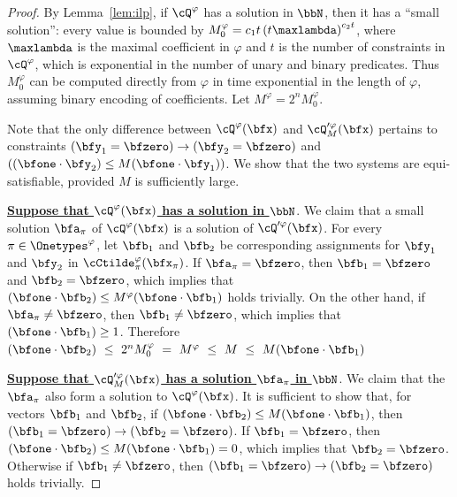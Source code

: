 \begin{proof}
    By Lemma~\ref{lem:ilp},
    if $\cQ^\varphi$ has a solution in $\bbN$,
    then it has a ``small solution'': every value is bounded by $M_0^\varphi = c_1t\left(t\maxlambda\right)^{c_2t}$,
    where $\maxlambda$ is the maximal coefficient in $\varphi$ and $t$ is the number of constraints in $\cQ^\varphi$, which is exponential in the number of unary and binary predicates.
    Thus $M_0^\varphi$ can be computed directly from $\varphi$ in time exponential in the length of $\varphi$, assuming binary encoding of coefficients.
    Let $M^\varphi = 2^{n}M_0^\varphi$.

    Note that the only difference between $\cQ^\varphi(\bfx)$ and $\cQ_{M}'^\varphi(\bfx)$
    pertains to constraints
    $(\bfy_1 = \bfzero) \to (\bfy_2 = \bfzero)$ and
    $ ((\bfone \cdot \bfy_2) \le M (\bfone \cdot \bfy_1))$.
    We show that the two systems are equi-satisfiable, provided $M$ is sufficiently large.

    \textbf{\uline{Suppose that $\cQ^\varphi(\bfx)$ has a solution in $\bbN$}}.
    We claim that a small solution $\bfa_{\pi}$ of $\cQ^\varphi(\bfx)$ 
    is a solution of $\cQ'^\varphi(\bfx)$.
    For every $\pi \in \Onetypes^\varphi$, 
    let $\bfb_1$ and $\bfb_2$ be corresponding assignments for $\bfy_1$ and $\bfy_2$ in $\cCtilde^\varphi_\pi(\bfx_\pi)$.
    If $\bfa_\pi = \bfzero$, then $\bfb_1 = \bfzero$ and $\bfb_2 = \bfzero$, 
    which implies that
    $(\bfone \cdot \bfb_2) \le M^\varphi (\bfone \cdot \bfb_1)$ holds trivially.
    On the other hand, if $\bfa_\pi \neq \bfzero$,
    then $\bfb_1 \neq \bfzero$, which implies that $(\bfone \cdot \bfb_1) \ge 1$.
    Therefore
    $(\bfone \cdot \bfb_2)
    \ \le\ 
    2^n M_0^\varphi
    \ =\ 
    M^\varphi
    \ \le\ 
    M
    \ \le\ 
    M (\bfone \cdot \bfb_1)$

    \textbf{\uline{Suppose that $\cQ_M'^\varphi(\bfx)$ has a solution $\bfa_{\pi}$ in $\bbN$}}.
    We claim that  the $\bfa_{\pi}$ also form a solution to $\cQ^\varphi(\bfx)$.
    It is sufficient to show that,
    for  vectors $\bfb_1$ and $\bfb_2$,
    if $(\bfone \cdot \bfb_2) \le M (\bfone \cdot \bfb_1)$,
    then $(\bfb_1 = \bfzero) \to (\bfb_2 = \bfzero)$.
    If $\bfb_1 = \bfzero$, then $(\bfone \cdot \bfb_2) \le M (\bfone \cdot \bfb_1) = 0$,
    which implies that $\bfb_2 = \bfzero$.
    Otherwise if $\bfb_1 \neq \bfzero$, 
    then $(\bfb_1 = \bfzero) \to (\bfb_2 = \bfzero)$ holds trivially.
\end{proof}


